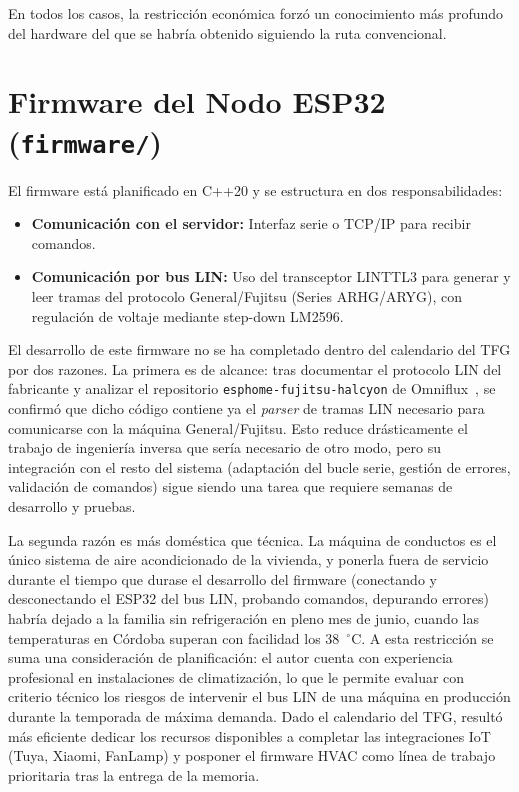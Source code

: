 En todos los casos, la restricción económica forzó un conocimiento más profundo del hardware del que se habría obtenido siguiendo la ruta convencional.

\section{Firmware del Nodo ESP32 (\texttt{firmware/})}
\label{sec:firmware_esp32}

El firmware está planificado en C++20 y se estructura en dos responsabilidades:
\begin{itemize}
    \item \textbf{Comunicación con el servidor:} Interfaz serie o TCP/IP para recibir comandos.
    \item \textbf{Comunicación por bus LIN:} Uso del transceptor LINTTL3 para generar y leer tramas del protocolo General/Fujitsu (Series ARHG/ARYG), con regulación de voltaje mediante step-down LM2596.
\end{itemize}

El desarrollo de este firmware no se ha completado dentro del calendario del TFG por dos razones. La primera es de alcance: tras documentar el protocolo LIN del fabricante y analizar el repositorio \texttt{esphome-fujitsu-halcyon} de Omniflux~\cite{omniflux_esphome_fujitsu}, se confirmó que dicho código contiene ya el \textit{parser} de tramas LIN necesario para comunicarse con la máquina General/Fujitsu. Esto reduce drásticamente el trabajo de ingeniería inversa que sería necesario de otro modo, pero su integración con el resto del sistema (adaptación del bucle serie, gestión de errores, validación de comandos) sigue siendo una tarea que requiere semanas de desarrollo y pruebas.

La segunda razón es más doméstica que técnica. La máquina de conductos es el único sistema de aire acondicionado de la vivienda, y ponerla fuera de servicio durante el tiempo que durase el desarrollo del firmware (conectando y desconectando el ESP32 del bus LIN, probando comandos, depurando errores) habría dejado a la familia sin refrigeración en pleno mes de junio, cuando las temperaturas en Córdoba superan con facilidad los 38~$^\circ$C. A esta restricción se suma una consideración de planificación: el autor cuenta con experiencia profesional en instalaciones de climatización, lo que le permite evaluar con criterio técnico los riesgos de intervenir el bus LIN de una máquina en producción durante la temporada de máxima demanda. Dado el calendario del TFG, resultó más eficiente dedicar los recursos disponibles a completar las integraciones IoT (Tuya, Xiaomi, FanLamp) y posponer el firmware HVAC como línea de trabajo prioritaria tras la entrega de la memoria.

